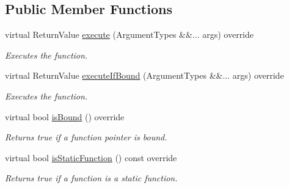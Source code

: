\subsection*{Public Member Functions}
\begin{DoxyCompactItemize}
\item 
virtual Return\+Value \mbox{\hyperlink{class_arcana_1_1_static_function_callback_instance_a9666f5e80b24e6e38e5d3766a6a577ac}{execute}} (Argument\+Types \&\&... args) override
\begin{DoxyCompactList}\small\item\em Executes the function. \end{DoxyCompactList}\item 
virtual Return\+Value \mbox{\hyperlink{class_arcana_1_1_static_function_callback_instance_a1e498222014df725ab8dfb737b48c2ef}{execute\+If\+Bound}} (Argument\+Types \&\&... args) override
\begin{DoxyCompactList}\small\item\em Executes the function. \end{DoxyCompactList}\item 
\mbox{\label{class_arcana_1_1_static_function_callback_instance_a059c7a2be305f5dbe88a64e5a67a807e}} 
virtual bool \mbox{\hyperlink{class_arcana_1_1_static_function_callback_instance_a059c7a2be305f5dbe88a64e5a67a807e}{is\+Bound}} () override
\begin{DoxyCompactList}\small\item\em Returns true if a function pointer is bound. \end{DoxyCompactList}\item 
\mbox{\label{class_arcana_1_1_static_function_callback_instance_af2fa2ba277adab6aaabfa78334f57b4a}} 
virtual bool \mbox{\hyperlink{class_arcana_1_1_static_function_callback_instance_af2fa2ba277adab6aaabfa78334f57b4a}{is\+Static\+Function}} () const override
\begin{DoxyCompactList}\small\item\em Returns true if a function is a static function. \end{DoxyCompactList}\item 
\mbox{\label{class_arcana_1_1_static_function_callback_instance_ae84257a632181a5d942cb61434cc8edc}} 

\end{DoxyCompactItemize}
